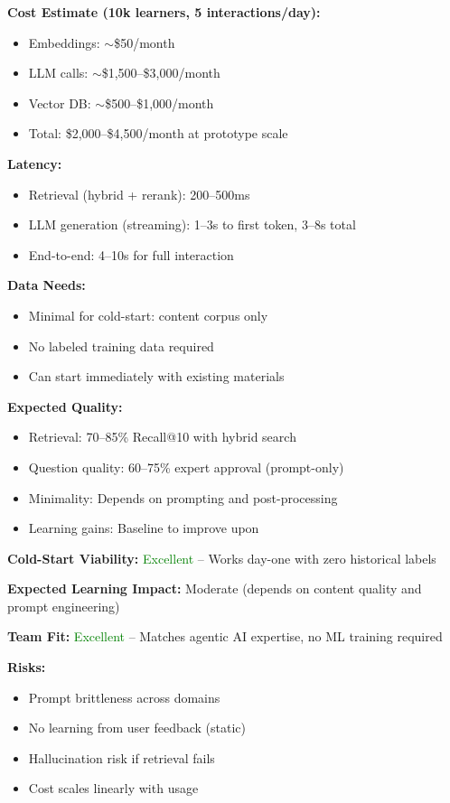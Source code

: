 \documentclass[11pt,letterpaper]{article}
\begin{document}
\textbf{Cost Estimate (10k learners, 5 interactions/day):}
\begin{itemize}
\item Embeddings: $\sim$\$50/month
\item LLM calls: $\sim$\$1,500--\$3,000/month
\item Vector DB: $\sim$\$500--\$1,000/month
\item Total: \$2,000--\$4,500/month at prototype scale
\end{itemize}

\textbf{Latency:}
\begin{itemize}
\item Retrieval (hybrid + rerank): 200--500ms
\item LLM generation (streaming): 1--3s to first token, 3--8s total
\item End-to-end: 4--10s for full interaction
\end{itemize}

\textbf{Data Needs:}
\begin{itemize}
\item Minimal for cold-start: content corpus only
\item No labeled training data required
\item Can start immediately with existing materials
\end{itemize}

\textbf{Expected Quality:}
\begin{itemize}
\item Retrieval: 70--85\% Recall@10 with hybrid search
\item Question quality: 60--75\% expert approval (prompt-only)
\item Minimality: Depends on prompting and post-processing
\item Learning gains: Baseline to improve upon
\end{itemize}

\textbf{Cold-Start Viability:} \textcolor{green}{Excellent} -- Works day-one with zero historical labels

\textbf{Expected Learning Impact:} Moderate (depends on content quality and prompt engineering)

\textbf{Team Fit:} \textcolor{green}{Excellent} -- Matches agentic AI expertise, no ML training required

\textbf{Risks:}
\begin{itemize}
\item Prompt brittleness across domains
\item No learning from user feedback (static)
\item Hallucination risk if retrieval fails
\item Cost scales linearly with usage
\end{itemize}
\end{document}
